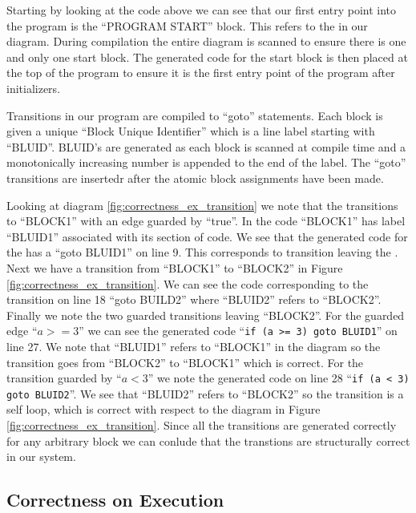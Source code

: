 Starting by looking at the code above we can see that our first entry point into the 
program is the ``PROGRAM START'' block. This refers to the  
in our diagram. During compilation the entire diagram is scanned to ensure there 
is one and only one start block. The generated code for the start block is then 
placed at the top of the program to ensure it is the first entry point of the 
program after initializers. 

Transitions in our program are compiled to ``goto'' statements. Each block is 
given a unique ``Block Unique Identifier'' which is a line label starting with 
``BLUID''. BLUID's are generated as each block is scanned at compile time and 
a monotonically increasing number is appended to the end of the label. The 
``goto'' transitions are insertedr after the atomic block assignments have been made.

Looking at diagram \ref{fig:correctness_ex_transition} we note that the  
transitions to ``BLOCK1'' with an edge guarded by ``true''. In the code ``BLOCK1'' has label 
``BLUID1'' associated with its section of code. We see that the generated code for the 
has a ``goto BLUID1'' on line 9. This corresponds to transition leaving the . 
Next we have a transition from ``BLOCK1'' to ``BLOCK2'' in Figure \ref{fig:correctness_ex_transition}. 
We can see the code corresponding to the transition on line 18 ``goto BUILD2'' where 
``BLUID2'' refers to ``BLOCK2''. Finally we note the two guarded transitions 
leaving ``BLOCK2''. For the guarded edge ``$a >= 3$'' we can see the generated 
code ``\texttt{if (a >= 3) goto BLUID1}'' on line 27. We note that ``BLUID1'' refers 
to ``BLOCK1'' in the diagram so the transition goes from ``BLOCK2'' to ``BLOCK1'' 
which is correct. For the transition guarded by ``$a < 3$'' we note the generated code 
on line 28 ``\texttt{if (a < 3) goto BLUID2}''. We see that ``BLUID2'' refers to ``BLOCK2'' 
so the transition is a self loop, which is correct with respect to the diagram in 
Figure \ref{fig:correctness_ex_transition}. Since all the transitions are generated correctly for
any arbitrary block we can conlude that the transtions are structurally correct in our system.





\clearpage
\subsection{Correctness on Execution}

